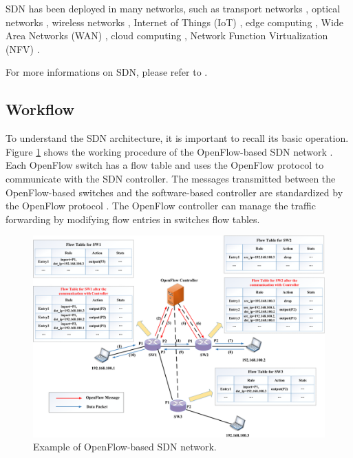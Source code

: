 \begin{itemize}
SDN has been deployed in many networks, such as transport networks \cite{Alvizu2017}, optical networks \cite{Thyagaturu2016}, wireless networks \cite{Haque2016, Chen2015}, Internet of Things (IoT) \cite{Bera2017}, edge computing \cite{Baktir2017}, Wide Area Networks (WAN) \cite{Michel2017}, cloud computing \cite{Jain2013}, Network Function Virtualization (NFV) \cite{Li2015, Liang2015}.
\end{itemize}
For more informations on SDN, please refer to \cite{Nunes2014, Jarraya2014, Xia2015, Hu2014, Xie2015, Trois2016, Huang2017, Blenk2016}.


\subsection{Workflow}
To understand the SDN architecture, it is important to recall its basic operation. Figure \ref{fig:{WorkFlow}} shows the working procedure of the OpenFlow-based SDN network \cite{OFP13}. Each OpenFlow switch has a flow table and uses the OpenFlow protocol to communicate with the SDN controller. The messages transmitted between the OpenFlow-based switches and the software-based controller are standardized by the OpenFlow protocol \cite{Erickson2013}. The OpenFlow controller can manage the traffic forwarding by modifying flow entries in switches flow tables.
\begin{figure}[tb!]
	\centering
	\includegraphics[width=13cm]{figure/WorkFlow.png}
	\caption{Example of OpenFlow-based SDN network.}
	\label{fig:{WorkFlow}}
\end{figure}
